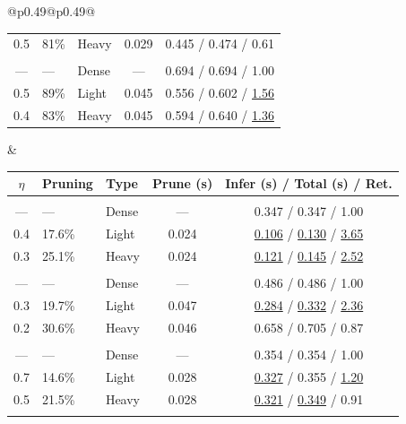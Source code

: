 \begin{table}[!htbp]
\begin{tabular}{@{}p{}@{}p{}@{}}
\begin{tabular}{c l l c c}
0.5 & 81\% & Heavy & 0.029 & 0.445 / 0.474 / 0.61 \\
\addlinespace[0.5pt]
\rowcolor{lightgray} \multicolumn{5}{c}{\rule{0pt}{2.2ex}\textbf{LLaMA-2-13B (OOD)}\rule[-0.8ex]{0pt}{0pt}} \\
--- & --- & Dense & --- & 0.694 / 0.694 / 1.00 \\
0.5 & 89\% & Light & 0.045 & 0.556 / 0.602 / \underline{1.56} \\
0.4 & 83\% & Heavy & 0.045 & 0.594 / 0.640 / \underline{1.36} \\
\bottomrule
\end{tabular} &\begin{tabular}{c l l c c}
\toprule
\textbf{$\eta$} & \textbf{Pruning} & \textbf{Type} & \textbf{Prune (s)} & \textbf{Infer (s)} / \textbf{Total (s)} / \textbf{Ret.} \\
\midrule
\rowcolor{lightgray} \multicolumn{5}{c}{\rule{0pt}{2.2ex}\textbf{Qwen2.5-7B (Natural Questions)}\rule[-0.8ex]{0pt}{0pt}} \\
--- & --- & Dense & --- & 0.347 / 0.347 / 1.00 \\
0.4 & 17.6\% & Light & 0.024 & \underline{0.106} / \underline{0.130} / \underline{3.65} \\
0.3 & 25.1\% & Heavy & 0.024 & \underline{0.121} / \underline{0.145} / \underline{2.52} \\
\addlinespace[0.5pt]
\rowcolor{lightgray} \multicolumn{5}{c}{\rule{0pt}{2.2ex}\textbf{Qwen2.5-14B (Natural Questions)}\rule[-0.8ex]{0pt}{0pt}} \\
--- & --- & Dense & --- & 0.486 / 0.486 / 1.00 \\
0.3 & 19.7\% & Light & 0.047 & \underline{0.284} / \underline{0.332} / \underline{2.36} \\
0.2 & 30.6\% & Heavy & 0.046 & 0.658 / 0.705 / 0.87 \\
\addlinespace[0.5pt]
\rowcolor{lightgray} \multicolumn{5}{c}{\rule{0pt}{2.2ex}\textbf{LLaMA-3.1-8B (Natural Questions)}\rule[-0.8ex]{0pt}{0pt}} \\
--- & --- & Dense & --- & 0.354 / 0.354 / 1.00 \\
0.7 & 14.6\% & Light & 0.028 & \underline{0.327} / 0.355 / \underline{1.20} \\
0.5 & 21.5\% & Heavy & 0.028 & \underline{0.321} / \underline{0.349} / 0.91 \\
\addlinespace[0.5pt]
\rowcolor{lightgray} \multicolumn{5}{c}{\rule{0pt}{2.2ex}\textbf{LLaMA-2-13B (Natural Questions)}\rule[-0.8ex]{0pt}{0pt}} \\

\end{tabular}
\end{tabular}
\end{table}

